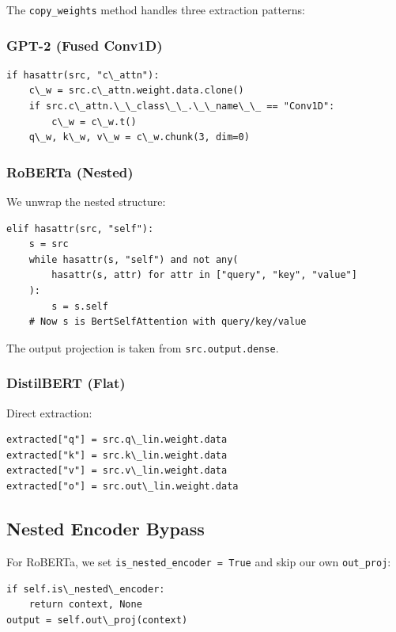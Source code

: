The \texttt{copy\_weights} method handles three extraction patterns:

\subsubsection{GPT-2 (Fused Conv1D)}

\begin{lstlisting}
if hasattr(src, "c\_attn"):
    c\_w = src.c\_attn.weight.data.clone()
    if src.c\_attn.\_\_class\_\_.\_\_name\_\_ == "Conv1D":
        c\_w = c\_w.t()
    q\_w, k\_w, v\_w = c\_w.chunk(3, dim=0)
\end{lstlisting}

\subsubsection{RoBERTa (Nested)}

We unwrap the nested structure:

\begin{lstlisting}
elif hasattr(src, "self"):
    s = src
    while hasattr(s, "self") and not any(
        hasattr(s, attr) for attr in ["query", "key", "value"]
    ):
        s = s.self
    # Now s is BertSelfAttention with query/key/value
\end{lstlisting}

The output projection is taken from \texttt{src.output.dense}.

\subsubsection{DistilBERT (Flat)}

Direct extraction:

\begin{lstlisting}
extracted["q"] = src.q\_lin.weight.data
extracted["k"] = src.k\_lin.weight.data
extracted["v"] = src.v\_lin.weight.data
extracted["o"] = src.out\_lin.weight.data
\end{lstlisting}

\subsection{Nested Encoder Bypass}

For RoBERTa, we set \texttt{is\_nested\_encoder = True} and skip our own \texttt{out\_proj}:

\begin{lstlisting}
if self.is\_nested\_encoder:
    return context, None
output = self.out\_proj(context)
\end{lstlisting}

